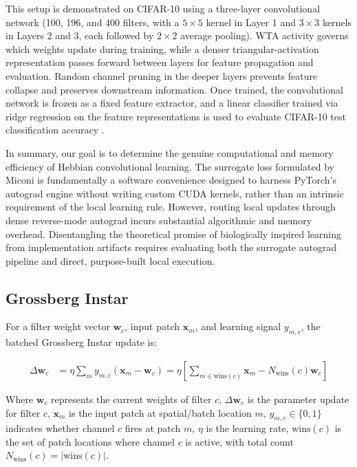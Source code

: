 \documentclass{article}
\begin{document}
    This setup is demonstrated on CIFAR-10 using a three-layer convolutional network (100, 196, and 400 filters, with a $5\times 5$ kernel in Layer 1 and $3\times 3$ kernels in Layers 2 and 3, each followed by $2\times 2$ average pooling). WTA activity governs which weights update during training, while a denser triangular-activation representation passes forward between layers for feature propagation and evaluation. Random channel pruning in the deeper layers prevents feature collapse and preserves downstream information. Once trained, the convolutional network is frozen as a fixed feature extractor, and a linear classifier trained via ridge regression on the feature representations is used to evaluate CIFAR-10 test classification accuracy \citep{miconi2021hebbian}.
    
    In summary, our goal is to determine the genuine computational and memory efficiency of Hebbian convolutional learning. The surrogate loss formulated by Miconi is fundamentally a software convenience designed to harness PyTorch's autograd engine without writing custom CUDA kernels, rather than an intrinsic requirement of the local learning rule. However, routing local updates through dense reverse-mode autograd incurs substantial algorithmic and memory overhead. Disentangling the theoretical promise of biologically inspired learning from implementation artifacts requires evaluating both the surrogate autograd pipeline and direct, purpose-built local execution.
    \subsection{Grossberg Instar} 
    
    For a filter weight vector $\mathbf{w}_c$, input patch $\mathbf{x}_m$, and learning signal $y_{m,c}$, the batched Grossberg Instar update is:

\begin{align}
\Delta \mathbf{w}_c &= \eta \sum_m y_{m,c} (\mathbf{x}_m - \mathbf{w}_c) = \eta \left[ \sum_{m \in \text{wins}(c)} \mathbf{x}_m - N_{\text{wins}}(c)\mathbf{w}_c \right]
\label{eq:instar_expanded}
\end{align}

Where $\mathbf{w}_c$ represents the current weights of filter $c$, $\Delta\mathbf{w}_c$ is the parameter update for filter $c$, $\mathbf{x}_m$ is the input patch at spatial/batch location $m$, $y_{m,c} \in \{0, 1\}$ indicates whether channel $c$ fires at patch $m$, $\eta$ is the learning rate, $\text{wins}(c)$ is the set of patch locations where channel $c$ is active, with total count $N_{\text{wins}}(c) = \vert{}\text{wins}(c)\vert{}$.
\end{document}
